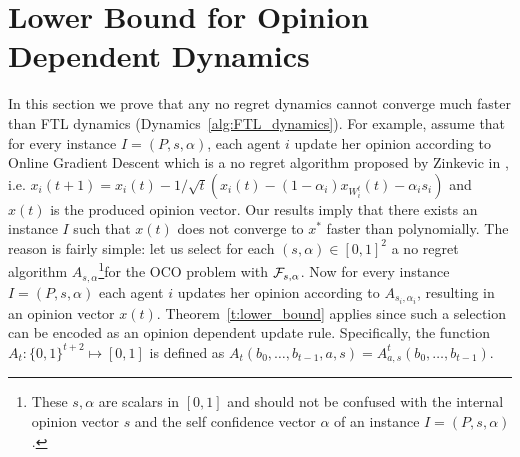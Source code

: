 \section{Lower Bound for Opinion Dependent Dynamics}\label{s:lower_bound}
In this section we prove that any no regret dynamics cannot converge much
faster than FTL dynamics (Dynamics~\ref{alg:FTL_dynamics}). For example, assume
that for every instance $I=(P,s,\alpha)$, each agent $i$ update
her opinion according to Online Gradient Descent which is a no regret algorithm
proposed by Zinkevic in \cite{Z03}, i.e.
$x_i(t+1)= x_i(t) - 1/\sqrt{t}(x_i(t)-(1-\alpha_i)x_{W_i^t}(t)-\alpha_is_i)$
and $x(t)$ is the produced opinion vector.  Our results imply that there exists
an instance $I$ such that $x(t)$ does not converge to $x^*$ faster than polynomially.
The reason is fairly simple: let us select for each $(s,\alpha) \in [0,1]^2$ a
no regret algorithm
$A_{s,\alpha}$\footnote{
These $s,\alpha$ are scalars in $[0,1]$ and
should not be confused with the internal opinion vector $s$
and the self confidence vector $\alpha$ of an instance $I=(P,s,\alpha)$.}for the OCO problem with
$\mathcal{F}_{s,\alpha}$. Now for every instance $I=(P,s,\alpha)$ each agent $i$ updates her
opinion according to $A_{s_i,\alpha_i}$,
resulting in an opinion vector $x(t)$.
Theorem~\ref{t:lower_bound} applies since such a selection
can be encoded as an opinion dependent update rule.
Specifically, the function $A_t:\{0,1\}^{t+2} \mapsto [0,1]$ is defined
as $A_t(b_0,\ldots,b_{t-1},a,s) = A^t_{a,s}(b_0,\ldots,b_{t-1})$.

